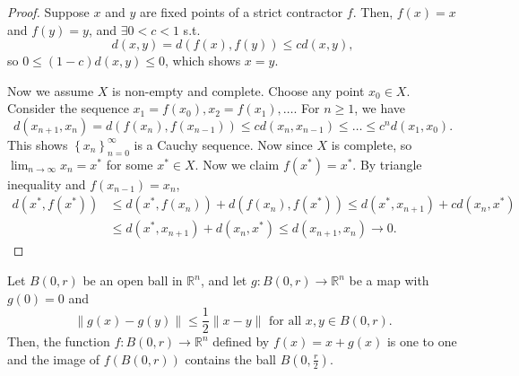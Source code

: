 \begin{proof}
    Suppose \(x\) and \(y\) are fixed points of a strict contractor \(f\). Then, \(f(x) = x\) and \(f(y) = y\), and \(\exists 0 < c < 1\) s.t. 
    \[
        d(x, y) = d(f(x), f(y)) \le c d(x, y),
    \]      
    so \(0 \le (1 - c) d(x, y) \le 0\), which shows \(x = y\).

    Now we assume \(X\) is non-empty and complete. Choose any point \(x_0 \in X\). Consider the sequence \(x_1 = f(x_0), x_2 = f(x_1), \dots\). For \(n \ge 1\), we have 
    \[
        d(x_{n+1}, x_n) = d(f(x_n), f(x_{n-1})) \le c d(x_n, x_{n-1}) \le  \dots \le c^n d(x_1, x_0).
    \]     
    This shows \(\left\{ x_n \right\}_{n=0}^{\infty } \) is a Cauchy sequence. Now since \(X\) is complete, so \(\lim_{n \to \infty} x_n = x^* \) for some \(x^* \in X\). Now we claim \(f(x^*) = x^*\). By triangle inequality and \(f(x_{n-1}) = x_n\), 
    \begin{align*}
        d(x^*, f(x^*)) &\le d(x^*, f(x_n)) + d(f(x_n), f(x^*)) \le d(x^*, x_{n+1}) + c d(x_n, x^*) \\
        &\le d(x^*, x_{n+1}) + d(x_n, x^*) \le d(x_{n+1}, x_n) \to 0.
    \end{align*}    
\end{proof}

\begin{lemma} \label{lm: first lemma for inverse function theorem}
    Let \(B(0, r)\) be an open ball in \(\mathbb{R} ^n\), and let \(g: B(0, r) \to \mathbb{R} ^n\) be a map with \(g(0) = 0\) and 
    \[
        \lVert g(x) - g(y) \rVert \le \frac{1}{2} \lVert x - y \rVert \text{ for all } x, y \in B(0, r). 
    \]    
    Then, the function \(f: B(0, r) \to \mathbb{R} ^n\) defined by \(f(x) = x + g(x)\) is one to one and the image of \(f(B(0, r))\) contains the ball \(B \left( 0, \frac{r}{2} \right) \).    
\end{lemma}

